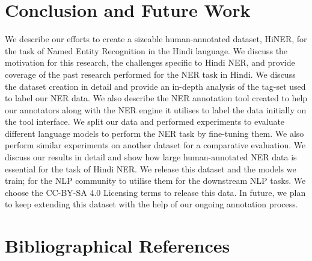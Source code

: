 \documentclass[10pt, a4paper]{article}
\begin{document}
\vspace{0.3cm}





%
 \section{Conclusion and Future Work}

We describe our efforts to create a sizeable human-annotated dataset, HiNER, for the task of Named Entity Recognition in the Hindi language. We discuss the motivation for this research, the challenges specific to Hindi NER, and provide coverage of the past research performed for the NER task in Hindi. We discuss the dataset creation in detail and provide an in-depth analysis of the tag-set used to label our NER data. We also describe the NER annotation tool created to help our annotators along with the NER engine it utilises to label the data initially on the tool interface. We split our data and performed experiments to evaluate different language models to perform the NER task by fine-tuning them. We also perform similar experiments on another dataset for a comparative evaluation. We discuss our results in detail and show how large human-annotated NER data is essential for the task of Hindi NER. We release this dataset and the models we train; for the NLP community to utilise them for the downstream NLP tasks. We choose the CC-BY-SA 4.0 Licensing terms to release this data. In future, we plan to keep extending this dataset with the help of our ongoing annotation process.
 


\section*{Bibliographical References}\label{reference}




\end{document}
